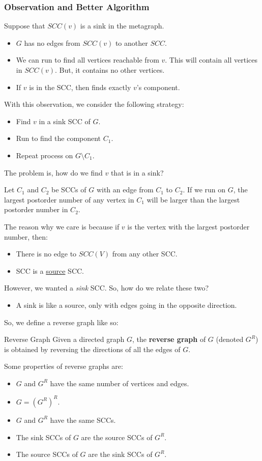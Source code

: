 \documentclass[letterpaper]{article}
\begin{document}
\subsubsection{Observation and Better Algorithm}
Suppose that $SCC(v)$ is a sink in the metagraph.
\begin{itemize}
    \item $G$ has no edges from $SCC(v)$ to another $SCC$. 
    \item We can run  to find all vertices reachable from $v$. This will contain all vertices in $SCC(v)$. But, it contains no other vertices. 
    \item If $v$ is in the SCC, then  finds exactly $v$'s component. 
\end{itemize}
With this observation, we consider the following strategy:
\begin{itemize}
    \item Find $v$ in a sink SCC of $G$. 
    \item Run  to find the component $C_1$.
    \item Repeat process on $G \setminus C_1$.
\end{itemize}
The problem is, how do we find $v$ that is in a sink?
\begin{proposition}
    Let $C_1$ and $C_2$ be SCCs of $G$ with an edge from $C_1$ to $C_2$. If we run  on $G$, the largest postorder number of any vertex in $C_1$ will be larger than the largest postorder number in $C_2$. 
\end{proposition}

The reason why we care is because if $v$ is the vertex with the largest postorder number, then: 
\begin{itemize}
    \item There is no edge to $SCC(V)$ from any other SCC. 
    \item SCC is a \underline{source} SCC.
\end{itemize}
However, we wanted a \emph{sink} SCC. So, how do we relate these two?
\begin{itemize}
    \item A sink is like a source, only with edges going in the opposite direction.
\end{itemize}
So, we define a reverse graph like so: 
\begin{definition}{Reverse Graph}{}
    Given a directed graph $G$, the \textbf{reverse graph} of $G$ (denoted $G^R$) is obtained by reversing the directions of all the edges of $G$.
\end{definition}
Some properties of reverse graphs are: 
\begin{itemize}
    \item $G$ and $G^R$ have the same number of vertices and edges. 
    \item $G = (G^R)^R$. 
    \item $G$ and $G^R$ have the same SCCs. 
    \item The sink SCCs of $G$ are the source SCCs of $G^R$. 
    \item The source SCCs of $G$ are the sink SCCs of $G^R$. 
\end{itemize}
\end{document}
